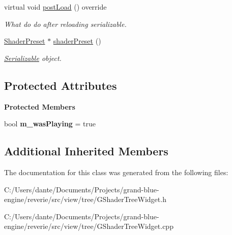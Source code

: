 \begin{Indent}
\begin{DoxyCompactItemize}
\mbox{\label{classrev_1_1_view_1_1_shader_json_widget_acba25c1212da65c20cbbed98d57474e1}} 
virtual void \mbox{\hyperlink{classrev_1_1_view_1_1_shader_json_widget_acba25c1212da65c20cbbed98d57474e1}{post\+Load}} () override
\begin{DoxyCompactList}\small\item\em What do do after reloading serializable. \end{DoxyCompactList}\item 
\mbox{\label{classrev_1_1_view_1_1_shader_json_widget_a51b1a7cab021b62756950d4ea2d808f2}} 
\mbox{\hyperlink{classrev_1_1_shader_preset}{Shader\+Preset}} $\ast$ \mbox{\hyperlink{classrev_1_1_view_1_1_shader_json_widget_a51b1a7cab021b62756950d4ea2d808f2}{shader\+Preset}} ()
\begin{DoxyCompactList}\small\item\em \mbox{\hyperlink{classrev_1_1_serializable}{Serializable}} object. \end{DoxyCompactList}\end{DoxyCompactItemize}
\end{Indent}
\subsection*{Protected Attributes}
\begin{Indent}\textbf{ Protected Members}\par
\begin{DoxyCompactItemize}
\item 
\mbox{\label{classrev_1_1_view_1_1_shader_json_widget_a960a64e375153b8e8116f3594c5279e5}} 
bool {\bfseries m\+\_\+was\+Playing} = true
\end{DoxyCompactItemize}
\end{Indent}
\subsection*{Additional Inherited Members}


The documentation for this class was generated from the following files\+:\begin{DoxyCompactItemize}
\item 
C\+:/\+Users/dante/\+Documents/\+Projects/grand-\/blue-\/engine/reverie/src/view/tree/G\+Shader\+Tree\+Widget.\+h\item 
C\+:/\+Users/dante/\+Documents/\+Projects/grand-\/blue-\/engine/reverie/src/view/tree/G\+Shader\+Tree\+Widget.\+cpp\end{DoxyCompactItemize}
